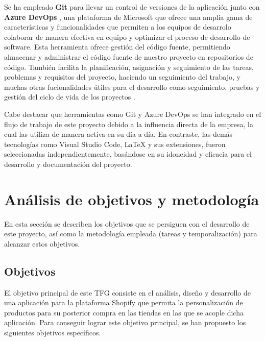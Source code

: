 \documentclass[11pt]{article}
\begin{document}
Se ha empleado \textbf{Git} \cite{git} para llevar un control de versiones de la aplicación junto con \textbf{Azure DevOps} \cite{azure-devops}, una plataforma de Microsoft que ofrece una amplia
gama de características y funcionalidades que permiten a los equipos de desarrolo colaborar de manera efectiva en equipo y optimizar el proceso de desarrollo
de software. Esta herramienta ofrece gestión del código fuente, permitiendo almacenar y administrar el código fuente de nuestro proyecto en 
repositorios de código. También facilita la planificación, asignación y seguimiento de las tareas, problemas y requisitos del proyecto, haciendo
un seguimiento del trabajo, y muchas otras fucionalidades útiles para el desarrollo como seguimiento, pruebas y gestión del ciclo de vida de los proyectos \cite{devOps}. 

Cabe destacar que herramientas como Git y Azure DevOps se han integrado en el flujo de trabajo de este proyecto debido a la influencia directa de la empresa, la cual las 
utiliza de manera activa en su día a día. En contraste, las demás tecnologías como Visual Studio Code, LaTeX y sus extensiones, fueron seleccionadas 
independientemente, basándose en su idoneidad y eficacia para el desarrollo y documentación del proyecto.

\clearpage
\section{Análisis de objetivos y metodología}
En esta sección se describen los objetivos que se persiguen con el desarrollo de este proyecto, así como la metodología empleada (tareas y temporalización) para alcanzar estos objetivos.

\subsection{Objetivos}

El objetivo principal de este TFG consiste en el análisis, diseño y desarrollo de una aplicación para la plataforma Shopify que permita
la personalización de productos para su posterior compra en las tiendas en las que se acople dicha aplicación. Para conseguir lograr este objetivo 
principal, se han propuesto los siguientes objetivos específicos.
\end{document}
